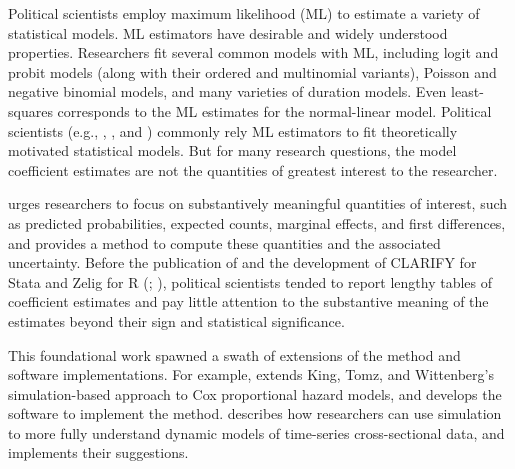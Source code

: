 \documentclass[11pt]{article}
\begin{document}


\thispagestyle{empty}

\onehalfspace

Political scientists employ maximum likelihood (ML) to estimate a variety of statistical models. ML estimators have desirable and widely understood properties. Researchers fit several common models with ML, including logit and probit models (along with their ordered and multinomial variants), Poisson and negative binomial models, and many varieties of duration models. Even least-squares corresponds to the ML estimates for the normal-linear model. Political scientists (e.g., \citealt{KatzKing1999}, \citealt{Mebane2000}, and \citealt{Sartori2003})  commonly  rely ML estimators to fit theoretically motivated statistical models. But for many research questions, the model coefficient estimates are not the quantities of greatest interest to the researcher.

\cite{KingTomzWittenberg2000} urges researchers to focus on substantively meaningful quantities of interest, such as predicted probabilities, expected counts, marginal effects, and first differences, and provides a method to compute these quantities and the associated uncertainty. Before the publication of \cite{KingTomzWittenberg2000} and the development of CLARIFY for Stata \citep{TomzWittenbergKing2003} and Zelig for R (\citealt{ImaiKingLau2008}; \citealt{Choiratetal}), political scientists tended to report lengthy tables of coefficient estimates and pay little attention to the substantive meaning of the estimates beyond their sign and statistical significance.

This foundational work spawned a swath of extensions of the method and software implementations. For example, \cite{Licht2011} extends King, Tomz, and Wittenberg's simulation-based approach to Cox proportional hazard models, and \cite{Gandrud2015} develops the software to implement the method. \cite{WilliamsWhitten2012} describes how researchers can use simulation to more fully understand dynamic models of time-series cross-sectional data, and \cite{WilliamsWhitten2011} implements their suggestions. 
\end{document}
